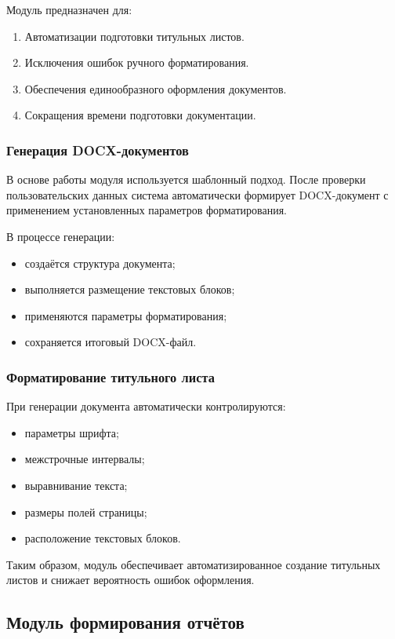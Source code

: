 Модуль предназначен для:
\begin{enumerate}
	\item Автоматизации подготовки титульных листов.
	\item Исключения ошибок ручного форматирования.
	\item Обеспечения единообразного оформления документов.
	\item Сокращения времени подготовки документации.
\end{enumerate}

\subsubsection{Генерация DOCX-документов}

В основе работы модуля используется шаблонный подход. После проверки пользовательских данных система автоматически формирует DOCX-документ с применением установленных параметров форматирования.

В процессе генерации:
\begin{itemize}
	\item создаётся структура документа;
	\item выполняется размещение текстовых блоков;
	\item применяются параметры форматирования;
	\item сохраняется итоговый DOCX-файл.
\end{itemize}

\subsubsection{Форматирование титульного листа}

При генерации документа автоматически контролируются:
\begin{itemize}
	\item параметры шрифта;
	\item межстрочные интервалы;
	\item выравнивание текста;
	\item размеры полей страницы;
	\item расположение текстовых блоков.
\end{itemize}

Таким образом, модуль обеспечивает автоматизированное создание титульных листов и снижает вероятность ошибок оформления.

\subsection{Модуль формирования отчётов}

